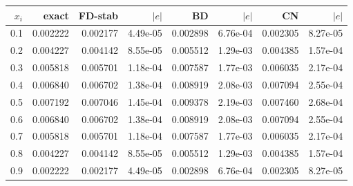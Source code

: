 \begin{tabular}{r r r r r r r r}\hline
$x_i$ & exact & FD-stab & $|e|$ & BD & $|e|$ & CN & $|e|$ \\
\hline
0.1 & 0.002222 & 0.002177 & 4.49e-05 & 0.002898 & 6.76e-04 & 0.002305 & 8.27e-05 \\
0.2 & 0.004227 & 0.004142 & 8.55e-05 & 0.005512 & 1.29e-03 & 0.004385 & 1.57e-04 \\
0.3 & 0.005818 & 0.005701 & 1.18e-04 & 0.007587 & 1.77e-03 & 0.006035 & 2.17e-04 \\
0.4 & 0.006840 & 0.006702 & 1.38e-04 & 0.008919 & 2.08e-03 & 0.007094 & 2.55e-04 \\
0.5 & 0.007192 & 0.007046 & 1.45e-04 & 0.009378 & 2.19e-03 & 0.007460 & 2.68e-04 \\
0.6 & 0.006840 & 0.006702 & 1.38e-04 & 0.008919 & 2.08e-03 & 0.007094 & 2.55e-04 \\
0.7 & 0.005818 & 0.005701 & 1.18e-04 & 0.007587 & 1.77e-03 & 0.006035 & 2.17e-04 \\
0.8 & 0.004227 & 0.004142 & 8.55e-05 & 0.005512 & 1.29e-03 & 0.004385 & 1.57e-04 \\
0.9 & 0.002222 & 0.002177 & 4.49e-05 & 0.002898 & 6.76e-04 & 0.002305 & 8.27e-05 \\
\hline
\end{tabular}
